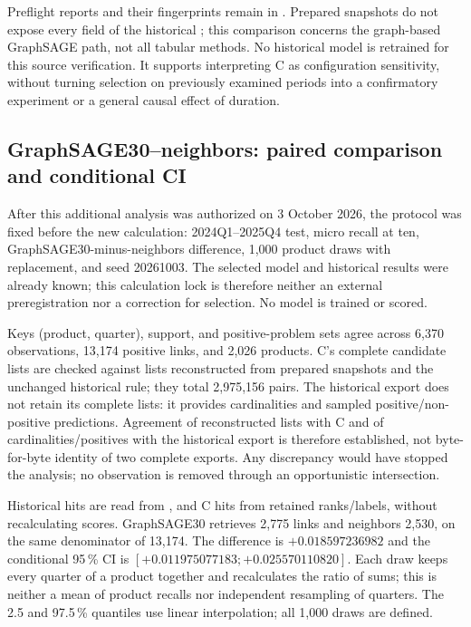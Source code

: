 Preflight reports and their fingerprints remain in . Prepared snapshots do not expose every field of the historical ; this comparison concerns the graph-based GraphSAGE path, not all tabular methods. No historical model is retrained for this source verification. It supports interpreting C as configuration sensitivity, without turning selection on previously examined periods into a confirmatory experiment or a general causal effect of duration.

\subsection{GraphSAGE30--neighbors: paired comparison and conditional CI}

After this additional analysis was authorized on 3 October 2026, the protocol was fixed before the new calculation: 2024Q1--2025Q4 test, micro recall at ten, GraphSAGE30-minus-neighbors difference, 1,000 product draws with replacement, and seed 20261003. The selected model and historical results were already known; this calculation lock is therefore neither an external preregistration nor a correction for selection. No model is trained or scored.

Keys (product, quarter), support, and positive-problem sets agree across 6,370 observations, 13,174 positive links, and 2,026 products. C's complete candidate lists are checked against lists reconstructed from prepared snapshots and the unchanged historical rule; they total 2,975,156 pairs. The historical export does not retain its complete lists: it provides cardinalities and sampled positive/non-positive predictions. Agreement of reconstructed lists with C and of cardinalities/positives with the historical export is therefore established, not byte-for-byte identity of two complete exports. Any discrepancy would have stopped the analysis; no observation is removed through an opportunistic intersection.

Historical hits are read from , and C hits from retained ranks/labels, without recalculating scores. GraphSAGE30 retrieves 2,775 links and neighbors 2,530, on the same denominator of 13,174. The difference is $+0.018597236982$ and the conditional 95\,\% CI is $[+0.011975077183;+0.025570110820]$. Each draw keeps every quarter of a product together and recalculates the ratio of sums; this is neither a mean of product recalls nor independent resampling of quarters. The 2.5 and 97.5\,\% quantiles use linear interpolation; all 1,000 draws are defined.

